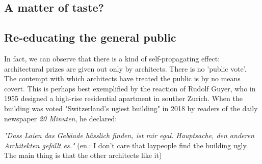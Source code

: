 \documentclass{article}
\begin{document}
\subsection{A matter of taste?}

\subsection{Re-educating the general public}

In fact, we can observe that there is a kind of self-propagating effect: architectural prizes are given out only by architects. There is no 'public vote'. The contempt with which architects have treated the public is by no means covert. This is perhaps best exemplified by the reaction of Rudolf Guyer, who in 1955 designed a high-rise residential apartment in souther Zurich. When the building was voted "Switzerland's ugiest building" in 2018 by readers of the daily newspaper \textit{20 Minuten}, he declared:

\textit{"Dass Laien das Gebäude hässlich finden, ist mir egal. Hauptsache, den anderen Architekten gefällt es."} (en.: I don't care that laypeople find the building ugly. The main thing is that the other architects like it) 
\end{document}
